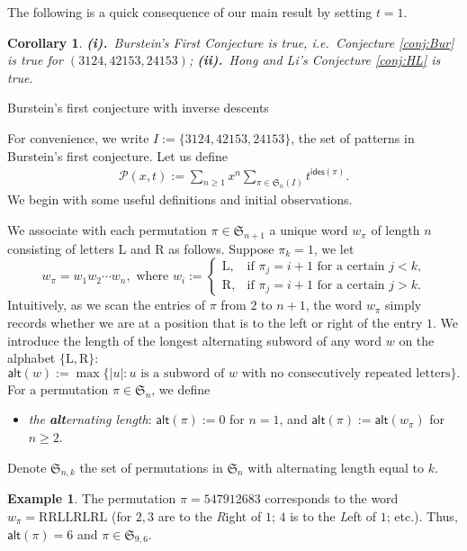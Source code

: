 \documentclass[reqno]{amsart}
\makeatletter
\numberwithin{equation}{section}
\theoremstyle{plain}
\newtheorem{corollary}[theorem]{Corollary}
\theoremstyle{definition}
\newtheorem{example}{Example}[section]
\theoremstyle{named}
\def\section{\@startsection{section}{1}
  \z@{.7\linespacing\@plus\linespacing}{.5\linespacing}

  {\normalfont\scshape}}
\newcommand{\fS}{\mathfrak{S}}
\newcommand{\ides}{\mathsf{ides}}
\newcommand{\alt}{\mathsf{alt}}
\newcommand{\cP}{\mathcal{P}}
\makeatother
\begin{document}
The following is a quick consequence of our main result by setting $t=1$.

\begin{corollary}
	\textbf{\emph{(i).}}~Burstein's First Conjecture is true, i.e.~Conjecture \ref{conj:Bur} is true for $(3124, 42153, 24153)$; \textbf{\emph{(ii).}}~Hong and Li's Conjecture \ref{conj:HL} is true.
\end{corollary}

\section{Burstein's first conjecture with inverse descents}

For convenience, we write $I:=\{3124,42153,24153\}$, the set of patterns in Burstein's first conjecture. Let us define
\begin{align}
	\cP(x,t):=\sum_{n\ge 1}x^n\sum_{\pi\in \fS_{n}(I)}t^{\ides(\pi)}.
\end{align}
We begin with some useful definitions and initial observations.

We associate with each permutation $\pi\in\fS_{n+1}$ a unique word $w_{\pi}$ of length $n$ consisting of letters $\mathrm{L}$ and $\mathrm{R}$ as follows. Suppose $\pi_k=1$, we let
$$
w_{\pi}=w_1w_2\cdots w_n, \text{ where }w_i:=\begin{cases}
	\mathrm{L}, & \text{if $\pi_j=i+1$ for a certain $j<k$,}\\
	\mathrm{R}, & \text{if $\pi_j=i+1$ for a certain $j>k$.}
\end{cases}
$$
Intuitively, as we scan the entries of $\pi$ from $2$ to $n+1$, the word $w_{\pi}$ simply records whether we are at a position that is to the left or right of the entry $1$. We introduce  the length of the longest alternating subword of any word $w$ on the alphabet $\{\mathrm{L},\mathrm{R}\}$:
$$\alt(w):=\max\{|u|:\text{$u$ is a subword of $w$ with no consecutively repeated letters}\}.$$
For a permutation $\pi\in\fS_n$, we define
\begin{itemize}[leftmargin=*,align=left]
	\renewcommand{\labelitemi}{$\triangleright$}
	\item \textit{the \textbf{alt}ernating length}: $\alt(\pi):=0$ for $n=1$, and $\alt(\pi):=\alt(w_{\pi})$ for $n\ge 2$.
\end{itemize}

Denote $\fS_{n,k}$ the set of permutations in $\fS_n$ with alternating length equal to $k$. 

\begin{example}
	The permutation $\pi=547912683$ corresponds to the word $w_{\pi}=\mathrm{R}\mathrm{R}\mathrm{L}\mathrm{L}\mathrm{R}\mathrm{L}\mathrm{R}\mathrm{L}$ (for $2,3$ are to the \textsl{R}ight of $1$; $4$ is to the \textsl{L}eft of $1$; etc.). Thus, $\alt(\pi)=6$ and $\pi\in\fS_{9,6}$.
\end{example}
\end{document}
